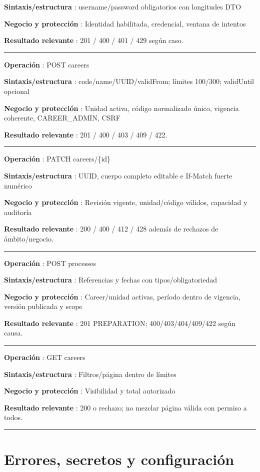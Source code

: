 \documentclass[12pt,a4paper]{report}
\begin{document}
\textbf{Sintaxis/estructura }: username/password obligatorios con
longitudes DTO

\textbf{Negocio y protección }: Identidad habilitada, credencial,
ventana de intentos

\textbf{Resultado relevante }: 201 / 400 / 401 / 429 según caso.

\medskip\hrule\medskip

\textbf{Operación }: POST careers

\textbf{Sintaxis/estructura }: code/name/UUID/validFrom; límites
100/300; validUntil opcional

\textbf{Negocio y protección }: Unidad activa, código normalizado único,
vigencia coherente, CAREER\_ADMIN, CSRF

\textbf{Resultado relevante }: 201 / 400 / 403 / 409 / 422.

\medskip\hrule\medskip

\textbf{Operación }: PATCH careers/\{id\}

\textbf{Sintaxis/estructura }: UUID, cuerpo completo editable e If-Match
fuerte numérico

\textbf{Negocio y protección }: Revisión vigente, unidad/código válidos,
capacidad y auditoría

\textbf{Resultado relevante }: 200 / 400 / 412 / 428 además de rechazos
de ámbito/negocio.

\medskip\hrule\medskip

\textbf{Operación }: POST processes

\textbf{Sintaxis/estructura }: Referencias y fechas con
tipos/obligatoriedad

\textbf{Negocio y protección }: Career/unidad activas, período dentro de
vigencia, versión publicada y scope

\textbf{Resultado relevante }: 201 PREPARATION; 400/403/404/409/422
según causa.

\medskip\hrule\medskip

\textbf{Operación }: GET careers

\textbf{Sintaxis/estructura }: Filtros/página dentro de límites

\textbf{Negocio y protección }: Visibilidad y total autorizado

\textbf{Resultado relevante }: 200 o rechazo; no mezclar página válida
con permiso a todos.

\medskip\hrule\medskip


\section{Errores, secretos y
configuración}\label{ACD4-semana-4-errores-secretos-y-configuraciuxf3n}
\end{document}
